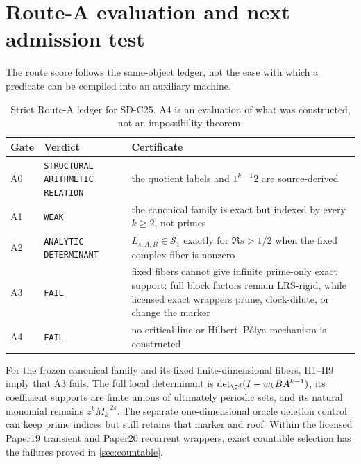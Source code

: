 \section{Route-A evaluation and next admission test}
\label{sec:route}

The route score follows the same-object ledger, not the ease with which a
predicate can be compiled into an auxiliary machine.

\begin{table}[H]
\centering
\caption{Strict Route-A ledger for SD-C25.  A4 is an evaluation of what was
constructed, not an impossibility theorem.}
\label{tab:route}
\small
\begin{tabularx}{\textwidth}{L{1.0cm}L{3.4cm}Y}
\toprule
Gate & Verdict & Certificate \\
\midrule
A0 & \texttt{STRUCTURAL}\newline
     \texttt{ARITHMETIC}\newline
     \texttt{RELATION}
& the quotient labels and $1^{k-1}2$ are source-derived \\
A1 & \texttt{WEAK}
& the canonical family is exact but indexed by every $k\ge2$, not primes \\
A2 & \texttt{ANALYTIC}\newline
     \texttt{DETERMINANT}
& $L_{s,A,B}\in\mathcal S_1$ exactly for $\Re s>1/2$ when the fixed complex fiber is nonzero \\
A3 & \texttt{FAIL}
& fixed fibers cannot give infinite prime-only exact support; full block factors remain LRS-rigid, while licensed exact wrappers prune, clock-dilute, or change the marker \\
A4 & \texttt{FAIL}
& no critical-line or Hilbert--P\'olya mechanism is constructed \\
\bottomrule
\end{tabularx}
\end{table}

\begin{theorem}
\label{thm:routeclosure}
For the frozen canonical family and its fixed finite-dimensional fibers,
H1--H9 imply that A3 fails.  The full local determinant is
\(
\det_{\C^d}(I-w_kBA^{k-1})
\), its coefficient supports are finite unions of ultimately periodic
sets, and its natural monomial remains $z^kM_k^{-2s}$.  The separate
one-dimensional oracle deletion control can keep prime indices but still
retains that marker and roof.  Within the licensed Paper19 transient and
Paper20 recurrent wrappers, exact countable selection has the failures
proved in \cref{sec:countable}.
\end{theorem}

